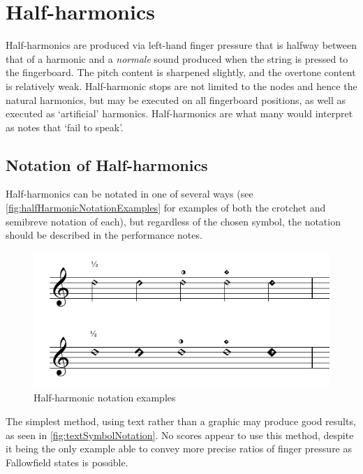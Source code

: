 \section{Half-harmonics}\label{sec:half-harmonics}
Half-harmonics are produced via left-hand finger pressure that is halfway between that of a harmonic and a \emph{normale} sound produced when the string is pressed to the fingerboard.
The pitch content is sharpened slightly, and the overtone content is relatively weak.\autocite[113]{welbanksFoundationsModernCello}
Half-harmonic stops are not limited to the nodes and hence the natural harmonics, but may be executed on all fingerboard positions, as well as executed as `artificial' harmonics.\autocite[127]{dimpkerExtendedNotationDepiction2012} 
Half-harmonics are what many would interpret as notes that `fail to speak'.


\subsection{Notation of Half-harmonics}\label{sec:notation-half-harmonics}
Half-harmonics can be notated in one of several ways (see \autoref{fig:halfHarmonicNotationExamples} for examples of both the crotchet and semibreve notation of each), but regardless of the chosen symbol, the notation should be described in the performance notes.

\begin{figure}
    \includegraphics[width=\linewidth]{./resources/halfHarmonicNotationExamples.pdf}
    \caption{Half-harmonic notation examples}\label{fig:halfHarmonicNotationExamples}
\end{figure}

  
The simplest method, using text rather than a graphic may produce good results, as seen in \autoref{fig:textSymbolNotation}.
No scores appear to use this method, despite it being the only example able to convey more precise ratios of finger pressure as Fallowfield states is possible.\autocite[http://www.cellomap.com/index/the-string/multiphonics-and-other-multiple-sounds/other-multiple-sounds.html]{fallowfieldCelloMap}

